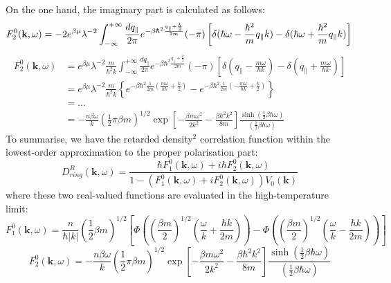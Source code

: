 On the one hand, the imaginary part is calculated as follows:
\begin{equation}
F^0_2(\mathbf k,\omega)=-2e^{\beta\mu}\lambda^{-2}\int_{-\infty}^{+\infty} \frac{d q_\parallel}{2\pi}e^{-\beta\hbar^2\frac{q_\parallel+\frac{k}{2}}{2m}} (-\pi)
\left[ \delta(\hbar \omega-\frac{\hbar^2}{m}q_\parallel k)-\delta(\hbar \omega+\frac{\hbar^2}{m}q_\parallel k) \right]\\
\end{equation}
\begin{equation}
\begin{aligned}
F^0_2(\mathbf k,\omega)&=e^{\beta\mu}\lambda^{-2}\frac{m}{\hbar^2 k} \int_{-\infty}^{+\infty} \frac{d q_\parallel}{2\pi}e^{-\beta\hbar^2\frac{q_\parallel+\frac{k}{2}}{2m}} (-\pi)
\left[ \delta(q_\parallel -\frac{m\omega}{\hbar k})-\delta(q_\parallel +\frac{m\omega}{\hbar k}) \right]\\
&=e^{\beta\mu}\lambda^{-2}\frac{m}{\hbar^2 k} \left\{ e^{-\beta\hbar^2 \frac{1}{2m}\left( \frac{m\omega}{\hbar k}+\frac{k}{2} \right)}-e^{-\beta\hbar^2 \frac{1}{2m}\left( -\frac{m\omega}{\hbar k}+\frac{k}{2} \right)} \right\}\\
&=...\\
&=-\frac{n\beta\omega}{k} \left( \frac{1}{2} \pi \beta m\right)^{1/2} \exp\left[ -\frac{\beta m\omega^2}{2k^2}-\frac{\beta\hbar^2 k^2}{8m} \right] \frac{\sinh \left( \frac{1}{2} \beta \hbar \omega \right)}{ \left( \frac{1}{2} \beta \hbar \omega \right)}
\end{aligned}
\end{equation}
To summarise, we have the retarded density$^2$ correlation function within the lowest-order approximation to the proper polarisation part:
\begin{equation}
D^R_{ring}(\mathbf k,\omega)=\frac{\hbar F^0_1(\mathbf k,\omega)+i\hbar F^0_2(\mathbf k,\omega)}{1-\left(F^0_1(\mathbf k,\omega)+iF^0_2(\mathbf k,\omega)\right)V_0(\mathbf k)}
\end{equation}
where these two real-valued functions are evaluated in the high-temperature limit:
\begin{equation}\label{eq4.9.40}
F^0_1(\mathbf k,\omega)=\frac{n}{\hbar |k|}  \left( \frac{1}{2} \beta m \right)^{1/2} 
\left[ \Phi \left(\left(\frac{\beta m}{2}\right)^{1/2} \left( \frac{\omega}{k}+\frac{\hbar k}{2m} \right)\right)- \Phi \left(\left(\frac{\beta m}{2}\right)^{1/2} \left( \frac{\omega}{k}-\frac{\hbar k}{2m} \right)\right) \right]
\end{equation}
\begin{equation}\label{eq4.9.41}
F^0_2(\mathbf k,\omega)=-\frac{n\beta\omega}{k} \left( \frac{1}{2} \pi \beta m\right)^{1/2} \exp\left[ -\frac{\beta m\omega^2}{2k^2}-\frac{\beta\hbar^2 k^2}{8m} \right] \frac{\sinh \left( \frac{1}{2} \beta \hbar \omega \right)}{ \left( \frac{1}{2} \beta \hbar \omega \right)}
\end{equation}
